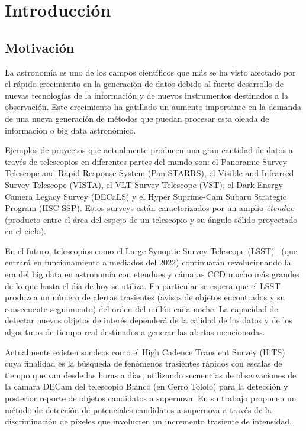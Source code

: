 \chapter{Introducción}
\label{ch:introduction}

\section{Motivaci\'on}
La astronomía es uno de los campos científicos que más se ha visto afectado por el rápido crecimiento en la generación de datos debido al fuerte desarrollo de nuevas tecnologías de la información y  de nuevos instrumentos destinados a la observación. Este crecimiento ha gatillado un aumento importante en la demanda de una nueva generaci\'on de m\'etodos que puedan procesar esta oleada de informaci\'on o big data astron\'omico.
\bigskip

Ejemplos de proyectos que actualmente producen una gran cantidad de datos a trav\'es de telescopios en diferentes partes del mundo son: el Panoramic Survey Telescope and Rapid Response System (Pan-STARRS), el Visible and Infrarred Survey Telescope (VISTA), el VLT Survey Telescope (VST), el Dark Energy Camera Legacy Survey (DECaLS) y el Hyper Suprime-Cam Subaru Strategic Program (HSC SSP). Estos surveys est\'an caracterizados por un amplio \textit{\'etendue} (producto entre el \'area del espejo de un telescopio y su \'angulo s\'olido proyectado en el cielo).
\bigskip

En el futuro, telescopios como el Large Synoptic Survey Telescope (LSST)~\cite{lsst} (que entrará en funcionamiento a mediados del 2022) continuar\'an revolucionando la era del big data en astronom\'ia con etendues y c\'amaras CCD mucho m\'as grandes de lo que hasta el d\'ia de hoy se utiliza. En particular se espera que el LSST produzca un n\'umero de alertas trasientes (avisos de objetos encontrados y su consecuente seguimiento) del orden del mill\'on cada noche. La capacidad de detectar nuevos objetos de inter\'es depender\'a de la calidad de los datos y de los algoritmos de tiempo real  destinados a generar las alertas mencionadas. 
\bigskip

Actualmente existen sondeos como el High Cadence Transient Survey (HiTS)~\cite{hits} cuya finalidad es la b\'usqueda de fen\'omenos trasientes r\'apidos con escalas de tiempo que van desde las horas a d\'ias, utilizando secuencias de observaciones de la c\'amara DECam del telescopio Blanco (en Cerro Tololo) para la detecci\'on y posterior reporte de objetos candidatos a supernova. En su trabajo proponen un m\'etodo de detecci\'on de potenciales candidatos a supernova a trav\'es de la discriminaci\'on de p\'ixeles que involucren un incremento trasiente de intensidad.
\bigskip

